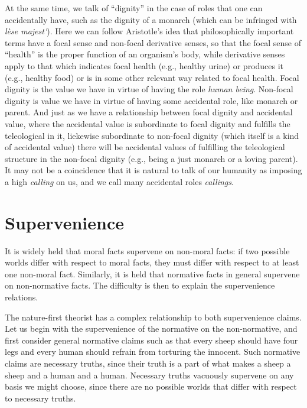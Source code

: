 At the same time, we talk of ``dignity'' in the case of roles that one can accidentally have, such as the dignity of a monarch
(which can be infringed with \textit{l\`ese majest\'}). Here we can follow Aristotle's idea that philosophically important terms have a 
focal sense and non-focal derivative senses, so that the focal sense of ``health'' is the proper function of an organism's body, 
while derivative senses apply to that which indicates focal health (e.g., healthy urine) or produces it (e.g., healthy food) or is in
some other relevant way related to focal health. Focal dignity is the value we have in virtue of having the role \textit{human being}.
Non-focal dignity is value we have in virtue of having some accidental role, like monarch or parent. And just as we have a relationship
between focal dignity and accidental value, where the accidental value is subordinate to focal dignity and fulfills the teleological 
in it, liekewise subordinate to non-focal dignity (which itself is a kind of accidental value) there will be accidental values of
fulfilling the teleological structure in the non-focal dignity (e.g., being a just monarch or a loving parent). It may not be a 
coincidence that it is natural to talk of our humanity as imposing a high \textit{calling} on us, and we call many accidental roles
\textit{callings}.

\section{Supervenience}
It is widely held that moral facts supervene on non-moral facts: if two possible worlds differ
with respect to moral facts, they must differ with respect to at least one non-moral fact. Similarly,
it is held that normative facts in general supervene on non-normative facts. The difficulty is then
to explain the supervenience relations.

The nature-first theorist has a complex relationship to both supervenience claims. Let us begin
with the supervenience of the normative on the non-normative, and first consider
general normative claims such as that every sheep should have four legs and every human should refrain
from torturing the innocent. Such normative claims are necessary truths, since their truth is a part of
what makes a sheep a sheep and a human and a human. Necessary truths vacuously supervene on any basis
we might choose, since there are no possible worlds that differ with respect to necessary truths.

